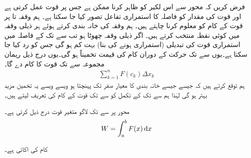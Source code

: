 فرض کریں  کہ محور  سے اس لکیر کو ظاہر کرنا ممکن ہے جس پر قوت عمل کرتی ہے اور قوت کی مقدار  کو  فاصلہ  کا استمراری تفاعل تصور کیا جا سکتا ہے۔ ہم وقفہ  تا  پر قوت کے کام کو معلوم کرنا چاہتے ہیں۔  ہم وقفہ  کی خانہ بندی کرتے ہوئے ہر ذیلی وقفہ  میں کوئی نقطہ  منتخب کرتے ہیں۔ اگر ذیلی وقفہ چھوٹا ہو تب  سے  تک کے  فاصلہ میں  استمراری  قوت  کی تبدیلی (استمراری ہونے کی بنا) بہت کم ہو گی جس کو رد کیا جا سکتا ہے۔یوں  سے  تک حرکت کے دوران کام کی قیمت تخمیناً  ہو گی۔یوں درج ذیل ریمان مجموعہ  سے  تک قوت  کا کام دے گا۔
\begin{align}
\sum_{k=1}^n F(c_k)\Delta x_k
\end{align}
ہم توقع کرتے ہیں کہ  جیسے جیسے خانہ بندی کا معیار صفر تک پہنچتا ہو ویسے ویسے یہ تخمین مزید بہتر ہو گی لہٰذا ہم  سے  تک  کے تکمل کو  سے  تک قوت  کے کام کی تعریف لیتے ہیں۔ 

محور  پر  سے  تک لاگو متغیر قوت  درج ذیل  کرتی ہے۔
\begin{align}
W=\int_a^bF(x)\dif x
\end{align}

کام کی اکائی   ہے۔


